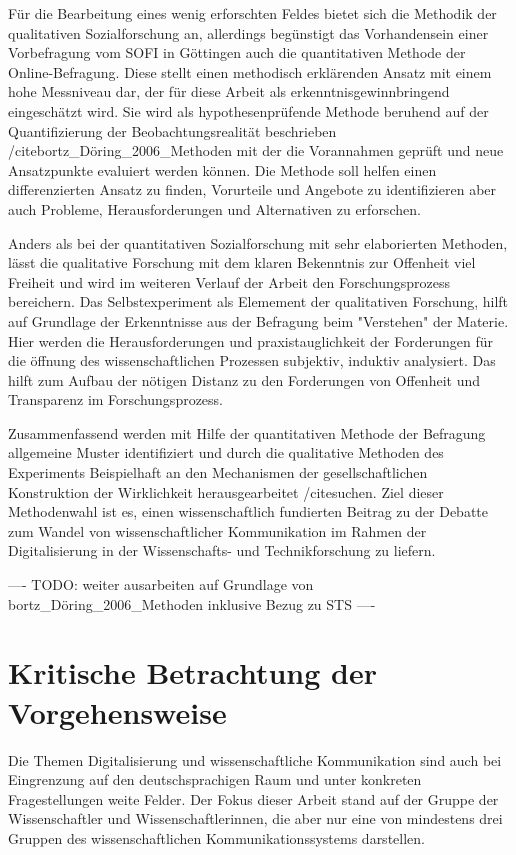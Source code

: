 Für die Bearbeitung eines wenig erforschten Feldes bietet sich die Methodik der qualitativen Sozialforschung an, allerdings begünstigt das Vorhandensein einer Vorbefragung vom SOFI in Göttingen auch die quantitativen Methode der Online-Befragung. Diese stellt einen methodisch erklärenden Ansatz mit einem hohe Messniveau dar, der für diese Arbeit als erkenntnisgewinnbringend eingeschätzt wird. Sie wird als hypothesenprüfende Methode beruhend auf der Quantifizierung der Beobachtungsrealität beschrieben /cite{bortz_Döring_2006_Methoden} mit der die Vorannahmen geprüft und neue Ansatzpunkte evaluiert werden können. Die Methode soll helfen einen differenzierten Ansatz zu finden, Vorurteile und Angebote zu identifizieren aber auch Probleme, Herausforderungen und Alternativen zu erforschen.

Anders als bei der quantitativen Sozialforschung mit sehr elaborierten Methoden,
lässt die qualitative Forschung mit dem klaren Bekenntnis zur Offenheit viel Freiheit und wird im weiteren Verlauf der Arbeit den Forschungsprozess bereichern. Das Selbstexperiment als Elemement der qualitativen Forschung, hilft auf Grundlage der Erkenntnisse aus der Befragung beim "Verstehen" der Materie. Hier werden die Herausforderungen und praxistauglichkeit der Forderungen für die öffnung des wissenschaftlichen Prozessen subjektiv, induktiv analysiert. Das hilft zum Aufbau der nötigen Distanz zu den Forderungen von Offenheit und Transparenz im Forschungsprozess.

Zusammenfassend werden mit Hilfe der quantitativen Methode der Befragung allgemeine Muster identifiziert und durch die qualitative Methoden des Experiments Beispielhaft an den Mechanismen der gesellschaftlichen Konstruktion der Wirklichkeit herausgearbeitet /cite{suchen}. Ziel dieser Methodenwahl ist es, einen wissenschaftlich fundierten Beitrag zu der Debatte zum Wandel von wissenschaftlicher Kommunikation im Rahmen der Digitalisierung in der Wissenschafts- und Technikforschung zu liefern.

---- TODO: weiter ausarbeiten auf Grundlage von bortz_Döring_2006_Methoden inklusive Bezug zu STS ----

\section{Kritische Betrachtung der Vorgehensweise}

Die Themen Digitalisierung und wissenschaftliche Kommunikation sind auch bei Eingrenzung auf den deutschsprachigen Raum und unter konkreten Fragestellungen weite Felder. Der Fokus dieser Arbeit stand auf der Gruppe der Wissenschaftler und Wissenschaftlerinnen, die aber nur eine von mindestens drei Gruppen des wissenschaftlichen Kommunikationssystems darstellen.

